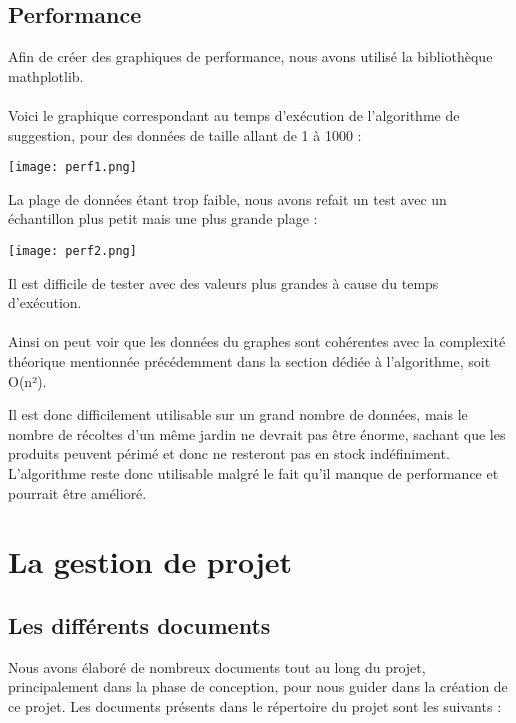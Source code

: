 \documentclass[12pt,titlepage]{report}
\begin{document}
\section{Performance}

Afin de créer des graphiques de performance, nous avons utilisé la bibliothèque mathplotlib. \\ \\
Voici le graphique correspondant au temps d’exécution de l’algorithme de suggestion, pour des données de taille allant de 1 à 1000 :

\begin{center}
     \texttt{[image: perf1.png]} 
\end{center}


La plage de données étant trop faible, nous avons refait un test avec un échantillon plus petit mais une plus grande plage :

\begin{center}
     \texttt{[image: perf2.png]} 
\end{center}

Il est difficile de tester avec des valeurs plus grandes à cause du temps d’exécution. \\ \\
Ainsi on peut voir que les données du graphes sont cohérentes avec la complexité théorique mentionnée précédemment dans la section dédiée à l’algorithme, soit O(n²).

Il est donc difficilement utilisable sur un grand nombre de données, mais le nombre de récoltes d'un même jardin ne devrait pas être énorme, sachant que les produits peuvent périmé et donc ne resteront pas en stock indéfiniment. L'algorithme reste donc utilisable malgré le fait qu'il manque de performance et pourrait être amélioré.



\chapter{La gestion de projet}

\section{Les différents documents}

Nous avons élaboré de nombreux documents tout au long du projet, principalement dans la phase de conception, pour nous guider dans la création de ce projet. Les documents présents dans le répertoire du projet sont les suivants :  \\
\end{document}
